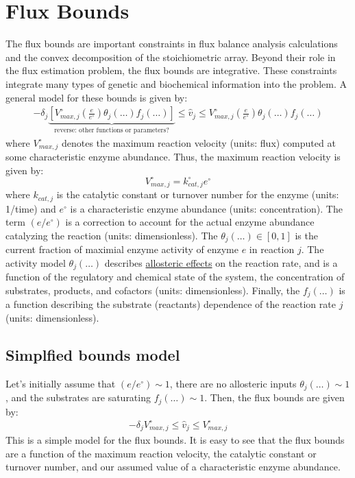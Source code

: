 \documentclass{article}[11pt]
\begin{document}
\section{Flux Bounds}\label{sec-flux-bounds}
The flux bounds are important constraints in flux balance analysis calculations and the convex decomposition of the stoichiometric array. 
Beyond their role in the flux estimation problem, the flux bounds are integrative. These constraints integrate many types of genetic and biochemical information into the problem. 
A general model for these bounds is given by:
\begin{align*}
-\delta_{j}\underbrace{\left[{V_{max,j}^{\circ}}\left(\frac{e}{e^{\circ}}\right)\theta_{j}\left(\dots\right){f_{j}\left(\dots\right)}\right]}_{\text{reverse: other functions or parameters?}}\leq\hat{v}_{j}\leq{V_{max,j}^{\circ}}\left(\frac{e}{e^{\circ}}\right)\theta_{j}\left(\dots\right){f_{j}\left(\dots\right)}
\end{align*}
where $V_{max,j}^{\circ}$ denotes the maximum reaction velocity (units: flux) computed at some characteristic enzyme abundance. 
Thus, the maximum reaction velocity is given by:
\begin{equation*}
V_{max,j}^{\circ} = k_{cat,j}^{\circ}e^{\circ}
\end{equation*}
where $k_{cat,j}$ is the catalytic constant or turnover number for the enzyme (units: 1/time) and $e^{\circ}$ is a characteristic enzyme abundance (units: concentration). 
The term $\left(e/e^{\circ}\right)$ is a correction to account for the actual enzyme abundance catalyzing the reaction (units: dimensionless). 
The $\theta_{j}\left(\dots\right)\in\left[0,1\right]$ is the current fraction of maximial enzyme activity of enzyme $e$ in reaction $j$. 
The activity model $\theta_{j}\left(\dots\right)$ describes \href{https://en.wikipedia.org/wiki/Allosteric_regulation}{allosteric effects} on the reaction rate, 
and is a function of the regulatory and chemical state of the system, the concentration of substrates, products, and cofactors (units: dimensionless).
Finally, the $f_{j}\left(\dots\right)$ is a function describing the substrate (reactants) dependence of the reaction rate $j$ (units: dimensionless). 

\subsection{Simplfied bounds model}
Let's initially assume that $(e/e^{\circ})\sim{1}$, there are no allosteric inputs $\theta_{j}\left(\dots\right)\sim{1}$, and the substrates are saturating $f_{j}\left(\dots\right)\sim{1}$. 
Then, the flux bounds are given by:
\begin{align*}
-\delta_{j}V_{max,j}^{\circ}\leq{\hat{v}_{j}}\leq{V_{max,j}^{\circ}}
\end{align*}
This is a simple model for the flux bounds. 
It is easy to see that the flux bounds are a function of the maximum reaction velocity, the catalytic constant or turnover number, and our assumed value of a characteristic enzyme abundance.
\end{document}
